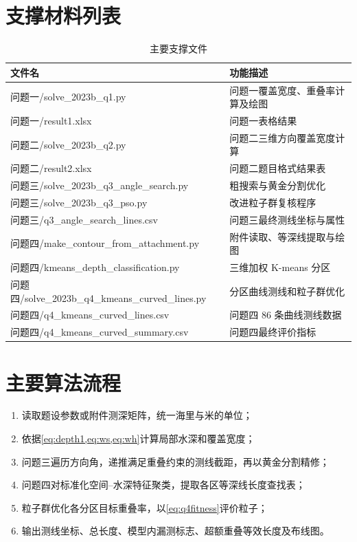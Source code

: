 \documentclass[withoutpreface,notoc]{cumcmthesis}
\begin{document}
\newpage
\begin{appendices}
\section{支撑材料列表}
\begin{table}[H]
\centering
\caption{主要支撑文件}
\begin{tabularx}{\textwidth}{LL}
\toprule
文件名 & 功能描述\\
\midrule
问题一/solve\_2023b\_q1.py & 问题一覆盖宽度、重叠率计算及绘图\\
问题一/result1.xlsx & 问题一表格结果\\
问题二/solve\_2023b\_q2.py & 问题二三维方向覆盖宽度计算\\
问题二/result2.xlsx & 问题二题目格式结果表\\
问题三/solve\_2023b\_q3\_angle\_search.py & 粗搜索与黄金分割优化\\
问题三/solve\_2023b\_q3\_pso.py & 改进粒子群复核程序\\
问题三/q3\_angle\_search\_lines.csv & 问题三最终测线坐标与属性\\
问题四/make\_contour\_from\_attachment.py & 附件读取、等深线提取与绘图\\
问题四/kmeans\_depth\_classification.py & 三维加权 K-means 分区\\
问题四/solve\_2023b\_q4\_kmeans\_curved\_lines.py & 分区曲线测线和粒子群优化\\
问题四/q4\_kmeans\_curved\_lines.csv & 问题四 86 条曲线测线数据\\
问题四/q4\_kmeans\_curved\_summary.csv & 问题四最终评价指标\\
\bottomrule
\end{tabularx}
\end{table}

\section{主要算法流程}
\begin{enumerate}
  \item 读取题设参数或附件测深矩阵，统一海里与米的单位；
  \item 依据\cref{eq:depth1,eq:ws,eq:wh}计算局部水深和覆盖宽度；
  \item 问题三遍历方向角，递推满足重叠约束的测线截距，再以黄金分割精修；
  \item 问题四对标准化空间--水深特征聚类，提取各区等深线长度查找表；
  \item 粒子群优化各分区目标重叠率，以\cref{eq:q4fitness}评价粒子；
  \item 输出测线坐标、总长度、模型内漏测标志、超额重叠等效长度及布线图。
\end{enumerate}


\end{appendices}
\end{document}
